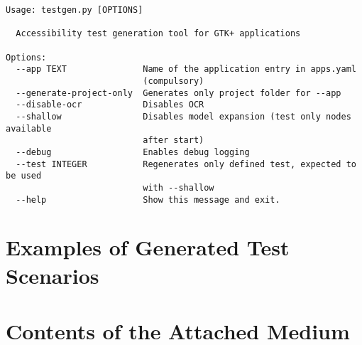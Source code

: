 \begin{lstlisting}[]
Usage: testgen.py [OPTIONS]

  Accessibility test generation tool for GTK+ applications

Options:
  --app TEXT               Name of the application entry in apps.yaml
                           (compulsory)
  --generate-project-only  Generates only project folder for --app
  --disable-ocr            Disables OCR
  --shallow                Disables model expansion (test only nodes available
                           after start)
  --debug                  Enables debug logging
  --test INTEGER           Regenerates only defined test, expected to be used
                           with --shallow
  --help                   Show this message and exit.

\end{lstlisting}



\chapter{Examples of Generated Test Scenarios}



\chapter{Contents of the Attached Medium}\label{medium}







